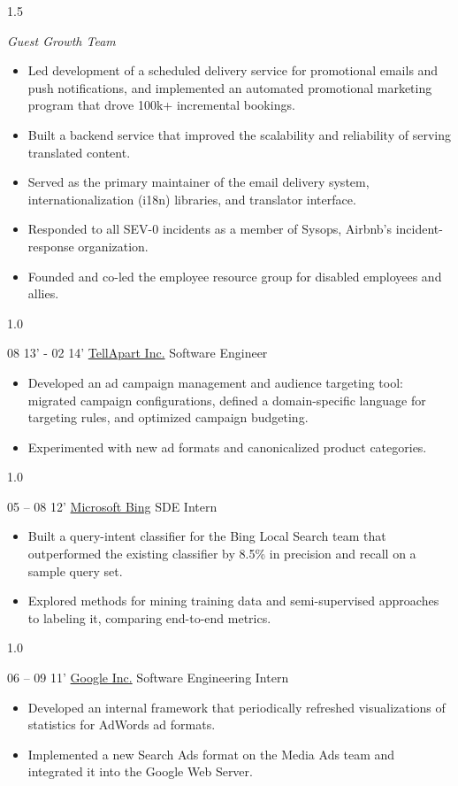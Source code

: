 \documentclass[]{patyoon-cv}
\begin{document}
\begin{entrylist}
{\begin{spacing}{1.5} \end{spacing}
\emph{\small Guest Growth Team}\\
\begin{itemize}
\item Led development of a scheduled delivery service for promotional emails and push notifications, and implemented an automated promotional marketing program that drove 100k+ incremental bookings.
\item Built a backend service that improved the scalability and reliability of serving translated content.
\item Served as the primary maintainer of the email delivery system, internationalization (i18n) libraries, and translator interface.
\item Responded to all SEV-0 incidents as a member of Sysops, Airbnb's incident-response organization.
\item Founded and co-led the employee resource group for disabled employees and allies.
\end{itemize}
\begin{spacing}{1.0} \end{spacing}
}
\entry
{08 13' - 02 14'}
{\href{https://tellapart.com/}{TellApart Inc.}}
{Software Engineer}
{\begin{itemize}
\item Developed an ad campaign management and audience targeting tool: migrated campaign configurations, defined a domain-specific language for targeting rules, and optimized campaign budgeting.
\item Experimented with new ad formats and canonicalized product categories.
\end{itemize}
\begin{spacing}{1.0} \end{spacing}
}
\end{entrylist}

\begin{entrylist}
\entry
{05 – 08 12'}
{\href{http://bing.com/}{Microsoft Bing}}
{SDE Intern}
{\begin{itemize}
\item Built a query-intent classifier for the Bing Local Search team that outperformed the existing classifier by 8.5\% in precision and recall on a sample query set.
\item Explored methods for mining training data and semi-supervised approaches to labeling it, comparing end-to-end metrics.
\end{itemize}
\begin{spacing}{1.0} \end{spacing}
}
\entry
{06 – 09 11'}
{\href{http://www.google.com}{Google Inc.}}
{Software Engineering Intern}
{\begin{itemize}
\item Developed an internal framework that periodically refreshed visualizations of statistics for AdWords ad formats.
\item Implemented a new Search Ads format on the Media Ads team and integrated it into the Google Web Server.
\end{itemize}}
\end{entrylist}
\end{document}
